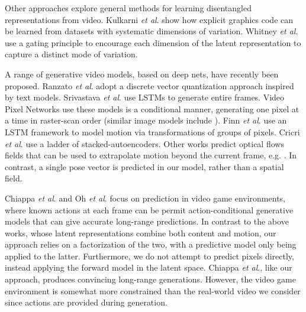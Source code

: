 \documentclass{article}
\newcommand{\etal}{\textit{et al}.\:}
\begin{document}
Other approaches explore general methods for learning disentangled
representations from video. Kulkarni \etal\cite{kulkarni2015deep} show how explicit
graphics code can be learned from datasets with systematic dimensions
of variation. Whitney \etal\cite{whitney2016understanding} use a
gating principle to encourage each dimension of the latent
representation to capture a distinct mode of variation.


A range of generative video models, based on deep nets, have recently
been proposed. Ranzato \etal\cite{Ranzato14} adopt a discrete vector
quantization approach inspired by text models. Srivastava \etal\cite{Srivastava15} use
LSTMs to generate entire frames. Video Pixel Networks
\cite{Kalchbrenner16} use these models is a conditional manner,
generating one pixel at a time in raster-scan order (similar image
models include \cite{salimans2017pixelcnn++, Oord16}). Finn \etal\cite{Finn16}
use an LSTM framework to model motion via transformations of groups of
pixels.  Cricri \etal\cite{cricri2016video} use a ladder of stacked-autoencoders.
Other works predict optical flows fields that can be used to
extrapolate motion beyond the current frame,
e.g. \cite{liu09,visualdynamics16,walker15}. In contrast, a single
pose vector is predicted in our model, rather than a spatial field.
 
Chiappa \etal\cite{Chiappa17} and Oh \etal\cite{oh15} focus on prediction in video game
environments, where known actions at each frame can be permit  action-conditional generative models that can give accurate
long-range predictions. In contrast to the above works, whose latent
representations combine both content and motion, our approach relies
on a factorization of the two, with a predictive model only being
applied to the latter. Furthermore, we do not attempt to predict pixels
directly, instead applying the forward model in the latent
space.  Chiappa \etal\cite{Chiappa17}, like our approach, produces
convincing long-range generations. However, the video game environment
is somewhat more constrained than the real-world video we consider since actions are provided during generation.
\end{document}
